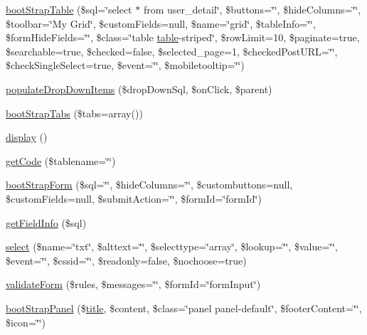 \begin{DoxyCompactItemize}
\item 
\hyperlink{classCody_a02b87ff5b670069a90d222359c929380}{boot\+Strap\+Table} (\$sql=\char`\"{}select $\ast$ from user\+\_\+detail\char`\"{}, \$buttons=\char`\"{}\char`\"{}, \$hide\+Columns=\char`\"{}\char`\"{}, \$toolbar=\char`\"{}My Grid\char`\"{}, \$custom\+Fields=null, \$name=\char`\"{}grid\char`\"{}, \$table\+Info=\char`\"{}\char`\"{}, \$form\+Hide\+Fields=\char`\"{}\char`\"{}, \$class=\char`\"{}table \hyperlink{Shape_8php_a5aa7b43c8ec77df216a71a27da0a321c}{table}-\/striped\char`\"{}, \$row\+Limit=10, \$paginate=true, \$searchable=true, \$checked=false, \$selected\+\_\+page=1, \$checked\+Post\+U\+R\+L=\char`\"{}\char`\"{}, \$check\+Single\+Select=true, \$event=\char`\"{}\char`\"{}, \$mobiletooltip=\char`\"{}\char`\"{})
\item 
\hyperlink{classCody_ade934190b62559aae3d784f7681253af}{populate\+Drop\+Down\+Items} (\$drop\+Down\+Sql, \$on\+Click, \$parent)
\item 
\hyperlink{classCody_a91baebb215438e27a00b211a2e352b14}{boot\+Strap\+Tabs} (\$tabs=array())
\item 
\hyperlink{classCody_a64eb434d16338231fbfc99e4a4e3ead1}{display} ()
\item 
\hyperlink{classCody_aec8a678a0829fbcf887a06bf0cb079fc}{get\+Code} (\$tablename=\char`\"{}\char`\"{})
\item 
\hyperlink{classCody_aa9b7f95b58c305f6eac09e3ed24c5dfe}{boot\+Strap\+Form} (\$sql=\char`\"{}\char`\"{}, \$hide\+Columns=\char`\"{}\char`\"{}, \$custombuttons=null, \$custom\+Fields=null, \$submit\+Action=\char`\"{}\char`\"{}, \$form\+Id=\char`\"{}form\+Id\char`\"{})
\item 
\hyperlink{classCody_a9190879d7bba88107875e2fe4723804c}{get\+Field\+Info} (\$sql)
\item 
\hyperlink{classCody_a11ec72bcb8aa970fd04b058bd3612cd0}{select} (\$name=\char`\"{}txt\char`\"{}, \$alttext=\char`\"{}\char`\"{}, \$selecttype=\char`\"{}array\char`\"{}, \$lookup=\char`\"{}\char`\"{}, \$value=\char`\"{}\char`\"{}, \$event=\char`\"{}\char`\"{}, \$cssid=\char`\"{}\char`\"{}, \$readonly=false, \$nochoose=true)
\item 
\hyperlink{classCody_ad923b413da151f230932758e98530a7f}{validate\+Form} (\$rules, \$messages=\char`\"{}\char`\"{}, \$form\+Id=\char`\"{}form\+Input\char`\"{})
\item 
\hyperlink{classCody_a286ac4c282deba8991d57ce83f43a07f}{boot\+Strap\+Panel} (\$\hyperlink{Shape_8php_ad264ad0cabbe965bf7f7c8a5ed6abebb}{title}, \$content, \$class=\char`\"{}panel panel-\/default\char`\"{}, \$footer\+Content=\char`\"{}\char`\"{}, \$icon=\char`\"{}\char`\"{})

\end{DoxyCompactItemize}

